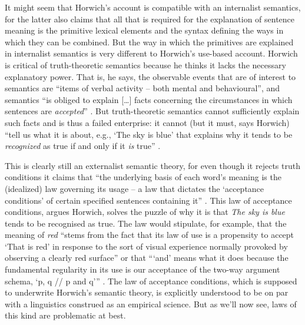 It might seem that Horwich’s account is compatible with an internalist semantics, for the latter also claims that all that is required for the explanation of sentence meaning is the primitive lexical elements and the syntax defining the ways in which they can be combined. But the way in which the primitives are explained in internalist semantics is very different to Horwich’s use-based account. Horwich is critical of truth-theoretic semantics because he thinks it lacks the necessary explanatory power. That is, he says, the observable events that are of interest to semantics are “items of verbal activity – both mental and behavioural”, and semantics “is obliged to explain […] facts concerning the circumstances in which sentences are \textit{accepted}” \citep[315, emphasis in original]{Horwich2008}. But truth-theoretic semantics cannot sufficiently explain such facts and is thus a failed enterprise: it cannot (but it must, says Horwich) “tell us what it is about, e.g., ‘The sky is blue’ that explains why it tends to be \textit{recognized} as true if and only if it \textit{is} true” \citep[317, emphasis in original]{Horwich2008}. 

This is clearly still an externalist semantic theory, for even though it rejects truth conditions it claims that “the underlying basis of each word’s meaning is the (idealized) law governing its usage -- a law that dictates the ‘acceptance conditions’ of certain specified sentences containing it” \citep[26]{Horwich2005}. This law of acceptance conditions, argues Horwich, solves the puzzle of why it is that \textit{The sky is blue} tends to be recognised as true. The law would stipulate, for example, that the meaning of \textit{red} “stems from the fact that its law of use is a propensity to accept ‘That is red’ in response to the sort of visual experience normally provoked by observing a clearly red surface” or that “‘and’ means what it does because the fundamental regularity in its use is our acceptance of the two-way argument schema, ‘p, q // p and q’” \citep[26]{Horwich2005}. The law of acceptance conditions, which is supposed to underwrite Horwich’s semantic theory, is explicitly understood to be on par with a linguistics construed as an empirical science. But as we’ll now see, laws of this kind are problematic at best.


